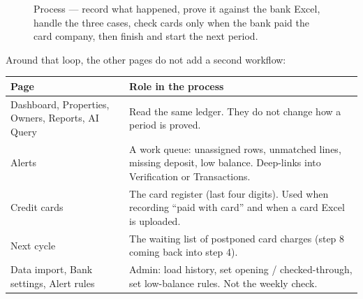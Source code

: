 \documentclass[11pt,a4paper]{article}
\begin{document}
\begin{figure}[H]
\caption{Process --- record what happened, prove it against the bank Excel,
handle the three cases, check cards only when the bank paid the card
company, then finish and start the next period.}
\end{figure}

Around that loop, the other pages do not add a second workflow:

\begin{center}
\begin{tabular}{@{}p{}p{}@{}}
\toprule
\textbf{Page} & \textbf{Role in the process} \\
\midrule
Dashboard, Properties, Owners, Reports, AI Query
  & Read the same ledger. They do not change how a period is proved. \\
\addlinespace
Alerts
  & A work queue: unassigned rows, unmatched lines, missing deposit, low balance.
    Deep-links into Verification or Transactions. \\
\addlinespace
Credit cards
  & The card register (last four digits). Used when recording ``paid with card''
    and when a card Excel is uploaded. \\
\addlinespace
Next cycle
  & The waiting list of postponed card charges (step 8 coming back into step 4). \\
\addlinespace
Data import, Bank settings, Alert rules
  & Admin: load history, set opening / checked-through, set low-balance rules.
    Not the weekly check. \\
\bottomrule
\end{tabular}
\end{center}
\end{document}
